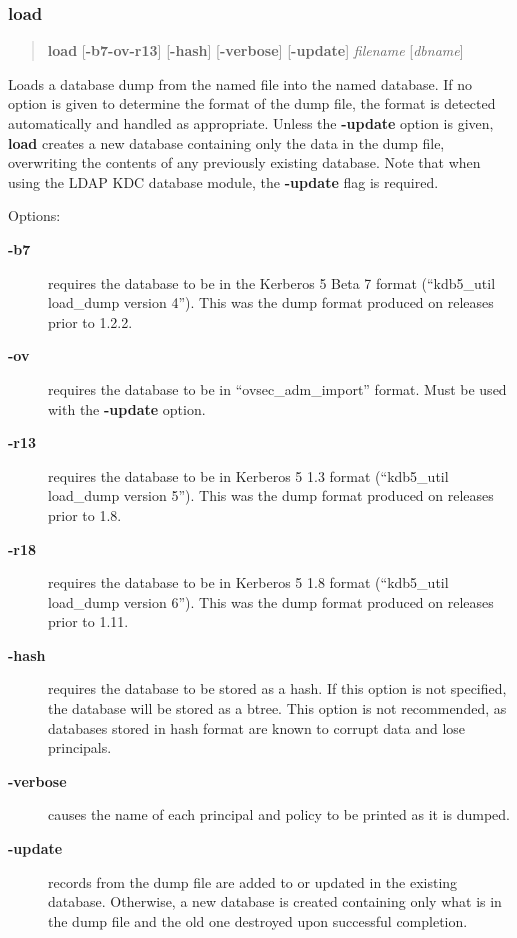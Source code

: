 \documentclass[letterpaper,10pt,english]{sphinxmanual}
\begin{document}
\subsubsection{load}
\label{admin/admin_commands/kdb5_util:kdb5-util-dump-end}\label{admin/admin_commands/kdb5_util:load}\label{admin/admin_commands/kdb5_util:kdb5-util-load}\begin{quote}

\textbf{load} {[}\textbf{-b7}\textbar{}\textbf{-ov}\textbar{}\textbf{-r13}{]} {[}\textbf{-hash}{]}
{[}\textbf{-verbose}{]} {[}\textbf{-update}{]} \emph{filename} {[}\emph{dbname}{]}
\end{quote}

Loads a database dump from the named file into the named database.  If
no option is given to determine the format of the dump file, the
format is detected automatically and handled as appropriate.  Unless
the \textbf{-update} option is given, \textbf{load} creates a new database
containing only the data in the dump file, overwriting the contents of
any previously existing database.  Note that when using the LDAP KDC
database module, the \textbf{-update} flag is required.

Options:
\begin{description}
\item[{\textbf{-b7}}] \leavevmode
requires the database to be in the Kerberos 5 Beta 7 format
(``kdb5\_util load\_dump version 4'').  This was the dump format
produced on releases prior to 1.2.2.

\item[{\textbf{-ov}}] \leavevmode
requires the database to be in ``ovsec\_adm\_import'' format.  Must be
used with the \textbf{-update} option.

\item[{\textbf{-r13}}] \leavevmode
requires the database to be in Kerberos 5 1.3 format (``kdb5\_util
load\_dump version 5'').  This was the dump format produced on
releases prior to 1.8.

\item[{\textbf{-r18}}] \leavevmode
requires the database to be in Kerberos 5 1.8 format (``kdb5\_util
load\_dump version 6'').  This was the dump format produced on
releases prior to 1.11.

\item[{\textbf{-hash}}] \leavevmode
requires the database to be stored as a hash.  If this option is
not specified, the database will be stored as a btree.  This
option is not recommended, as databases stored in hash format are
known to corrupt data and lose principals.

\item[{\textbf{-verbose}}] \leavevmode
causes the name of each principal and policy to be printed as it
is dumped.

\item[{\textbf{-update}}] \leavevmode
records from the dump file are added to or updated in the existing
database.  Otherwise, a new database is created containing only
what is in the dump file and the old one destroyed upon successful
completion.

\end{description}
\end{document}
